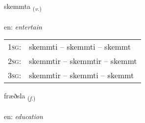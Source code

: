 \documentclass[frontgrid, backgrid]{flacards}\usepackage[]{graphicx}\usepackage[]{color}
\begin{document}
\renewcommand{\flhead}{\vskip5pt \fboxsep=0pt {\small\bfseries\footnotesize Sagnorð | Verb}}
\renewcommand{\fcfoot}{\vskip5pt \fboxsep=0pt \hspace{2pt}{\small\bfseries\footnotesize 2K}}

\renewcommand{\blhead}{\vskip5pt {\small\bfseries\footnotesize Sagnorð | Verb }}
\renewcommand{\bcfoot}{\vskip5pt \hspace{2pt}{\small\bfseries\footnotesize 2K}}


{skemmta \small{\textsubscript{(\textit{v.})}} \\[1ex] %
\textphonetic{[scɛm̥ta]} \\
en: \emph{entertain} \\  [2ex]
\renewcommand*{\arraystretch}{0.8}
\begin{tabular}{p{1cm}l}
\textsc{1sg}: & skemmti -- skemmti -- skemmt \\ 
\textsc{2sg}: & skemmtir -- skemmtir -- skemmt \\ 
\textsc{3sg}: & skemmtir -- skemmti -- skemmt \\ 
\end{tabular}
}

\renewcommand{\flhead}{\vskip5pt \fboxsep=0pt {\small\bfseries\footnotesize Nafnorð | Noun}}
\renewcommand{\fcfoot}{\vskip5pt \fboxsep=0pt \hspace{2pt}{\small\bfseries\footnotesize 2K}}

\renewcommand{\blhead}{\vskip5pt {\small\bfseries\footnotesize Nafnorð | Noun }}
\renewcommand{\bcfoot}{\vskip5pt \hspace{2pt}{\small\bfseries\footnotesize 2K}}


{fræðsla \small{\textsubscript{(\textit{f.})}} \\[1ex] %
\textphonetic{[fraiðstla]} \\
en: \emph{education} \\  [2ex]
\renewcommand*{\arraystretch}{0.8}
}
\end{document}
